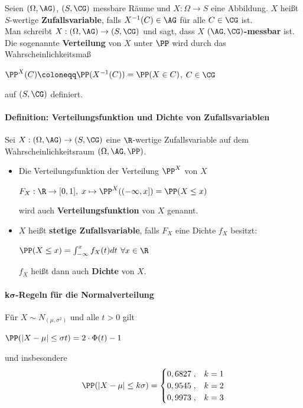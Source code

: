 Seien $(\Omega,\AG)$, $(S,\CG)$ messbare Räume und $X:\Omega\rightarrow S$ eine Abbildung.
$X$ heißt $S$-wertige \textbf{Zufallsvariable}, falls $X^{-1}(C)\in\AG$ für alle $C\in\CG$ ist.\\
Man schreibt $X:(\Omega,\AG)\rightarrow(S,\CG)$ und sagt, dass $X$ $(\AG,\CG)$\textbf{-messbar} ist.
Die sogenannte \textbf{Verteilung} von $X$ unter $\PP$ wird durch das Wahrscheinlichkeitsmaß
\begin{tightcenter}
	$\PP^X(C)\coloneqq\PP(X^{-1}(C))=\PP(X\in C)$, \qquad$C\in\CG$
\end{tightcenter}
auf $(S,\CG)$ definiert.

\paragraph{Definition: Verteilungsfunktion und Dichte von Zufallsvariablen}
Sei $X:(\Omega,\AG)\rightarrow(S,\CG)$ eine $\R$-wertige Zufallsvariable auf dem Wahrscheinlichkeitsraum $(\Omega,\AG,\PP)$.
\begin{itemize}
	\item Die Verteilungsfunktion der Verteilung $\PP^X$ von $X$
	\begin{tightcenter}
		$F_X:\R\rightarrow[0,1],\; x\mapsto\PP^X((-\infty,x])=\PP(X\leq x)$
	\end{tightcenter}
	wird auch \textbf{Verteilungsfunktion} von $X$ genannt.
	\item $X$ heißt \textbf{stetige Zufallsvariable}, falls $F_X$ eine Dichte $f_X$ besitzt:
	\begin{tightcenter}
		$\PP(X\leq x)=\int_{-\infty}^{x}f_X(t)dt$ \qquad$\forall x\in\R$
	\end{tightcenter}
	$f_X$ heißt dann auch \textbf{Dichte} von $X$.
\end{itemize}

\paragraph{k$\boldsymbol{\sigma}$-Regeln für die Normalverteilung}
Für $X\sim N_{(\mu,\sigma^2)}$ und alle $t>0$ gilt
\begin{tightcenter}
	$\PP(|X-\mu|\leq\sigma t)=2\cdot\Phi(t)-1$
\end{tightcenter}
und insbesondere
\[   
\PP(|X-\mu|\leq k\sigma)=
\begin{cases}
	0,6827\;, & k=1\\
	0,9545\;, & k=2\\
	0,9973\;, & k=3
\end{cases}
\]

